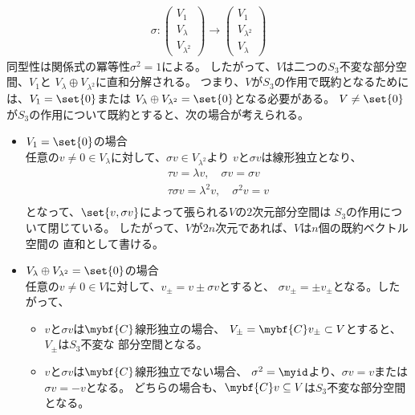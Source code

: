 	\begin{equation*}\begin{split} %
		\sigma: \begin{pmatrix}
			V_1 \\ V_{\lambda} \\ V_{\lambda^2}
		\end{pmatrix}\to \begin{pmatrix}
			V_1 \\ V_{\lambda^2} \\ V_{\lambda}
		\end{pmatrix}
	\end{split}\end{equation*} %
	同型性は関係式の冪等性$\sigma^2=1$による。
	したがって、$V$は二つの$S_3$不変な部分空間、$V_1$と
	$V_\lambda\oplus V_{\lambda^2}$に直和分解される。
	つまり、$V$が$S_3$の作用で既約となるためには、$V_1=\set{0}$または
	$V_\lambda\oplus V_{\lambda^2}=\set{0}$となる必要がある。
	$V\neq\set{0}$が$S_3$の作用について既約とすると、次の場合が考えられる。
	\begin{itemize}\setlength{\itemsep}{-1mm} %
		\item $V_1=\set{0}$の場合 \\
		任意の$v\neq 0\in V_\lambda$に対して、$\sigma v\in V_{\lambda^2}$より
		$v$と$\sigma v$は線形独立となり、
		\begin{equation*}\begin{split} %
			\tau v = \lambda v,\quad \sigma v = \sigma v \\
			\tau\sigma v = \lambda^2 v,\quad \sigma^2 v = v \\
		\end{split}\end{equation*} %
		となって、$\set{v,\sigma v}$によって張られる$V$の$2$次元部分空間は
		$S_3$の作用について閉じている。
		したがって、$V$が$2n$次元であれば、$V$は$n$個の既約ベクトル空間の
		直和として書ける。
		\item $V_\lambda\oplus V_{\lambda^2}=\set{0}$の場合 \\
		任意の$v\neq 0\in V$に対して、$v_\pm=v\pm\sigma v$とすると、
		$\sigma v_\pm=\pm v_\pm$となる。したがって、
		\begin{itemize}\setlength{\itemsep}{-1mm} %
			\item $v$と$\sigma v$は$\mybf{C}$線形独立の場合、
			$V_\pm=\mybf{C}v_\pm\subset V$とすると、$V_\pm$は$S_3$不変な
			部分空間となる。
			\item $v$と$\sigma v$は$\mybf{C}$線形独立でない場合、
			$\sigma^2=\myid$より、$\sigma v=v$または$\sigma v=-v$となる。
			どちらの場合も、$\mybf{C}v\subseteq V$は$S_3$不変な部分空間となる。
		\end{itemize} %
	\end{itemize} %

